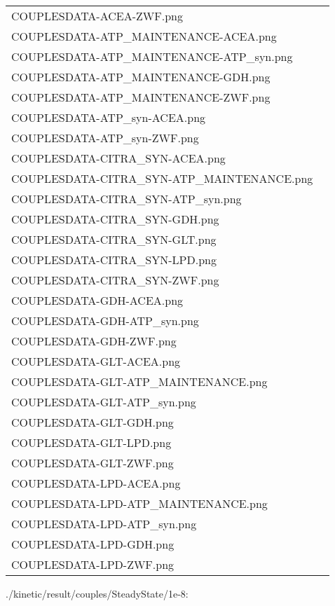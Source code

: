 \documentclass[a4paper, parskip=full]{scrreprt}
\begin{document}
\begin{longtable}{ll}
COUPLESDATA-ACEA-ZWF.png\\
COUPLESDATA-ATP\_MAINTENANCE-ACEA.png\\
COUPLESDATA-ATP\_MAINTENANCE-ATP\_syn.png\\
COUPLESDATA-ATP\_MAINTENANCE-GDH.png\\
COUPLESDATA-ATP\_MAINTENANCE-ZWF.png\\
COUPLESDATA-ATP\_syn-ACEA.png\\
COUPLESDATA-ATP\_syn-ZWF.png\\
COUPLESDATA-CITRA\_SYN-ACEA.png\\
COUPLESDATA-CITRA\_SYN-ATP\_MAINTENANCE.png\\
COUPLESDATA-CITRA\_SYN-ATP\_syn.png\\
COUPLESDATA-CITRA\_SYN-GDH.png\\
COUPLESDATA-CITRA\_SYN-GLT.png\\
COUPLESDATA-CITRA\_SYN-LPD.png\\
COUPLESDATA-CITRA\_SYN-ZWF.png\\
COUPLESDATA-GDH-ACEA.png\\
COUPLESDATA-GDH-ATP\_syn.png\\
COUPLESDATA-GDH-ZWF.png\\
COUPLESDATA-GLT-ACEA.png\\
COUPLESDATA-GLT-ATP\_MAINTENANCE.png\\
COUPLESDATA-GLT-ATP\_syn.png\\
COUPLESDATA-GLT-GDH.png\\
COUPLESDATA-GLT-LPD.png\\
COUPLESDATA-GLT-ZWF.png\\
COUPLESDATA-LPD-ACEA.png\\
COUPLESDATA-LPD-ATP\_MAINTENANCE.png\\
COUPLESDATA-LPD-ATP\_syn.png\\
COUPLESDATA-LPD-GDH.png\\
COUPLESDATA-LPD-ZWF.png\\
\end{longtable}

./kinetic/result/couples/SteadyState/1e-8:
\end{document}
